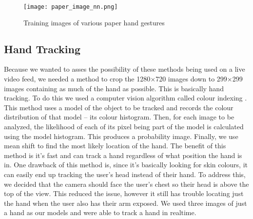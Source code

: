 \begin{figure}[h]
\texttt{[image: paper\_image\_nn.png]}
\centering
\caption{Training images of various paper hand gestures}
\end{figure}



\subsection{Hand Tracking}
Because we wanted to asses the possibility of these methods being used on a live video feed, we needed a method to crop the 1280$\times$720 images down to 299$\times$299 images containing as much of the hand as possible. This is basically hand tracking. To do this we used a computer vision algorithm called colour indexing \cite{swain}. This method uses a model of the object to be tracked and records the colour distribution of that model -- its colour histogram. Then, for each image to be analyzed, the likelihood of each of its pixel being part of the model is calculated using the model histogram. This produces a probability image. Finally, we use mean shift to find the most likely location of the hand. The benefit of this method is it's fast and can track a hand regardless of what position the hand is in. One drawback of this method is, since it's basically looking for skin colours, it can easily end up tracking the user's head instead of their hand. To address this, we decided that the camera should face the user's chest so their head is above the top of the view. This reduced the issue, however it still has trouble locating just the hand when the user also has their arm exposed. We used three images of just a hand as our models and were able to track a hand in realtime. 